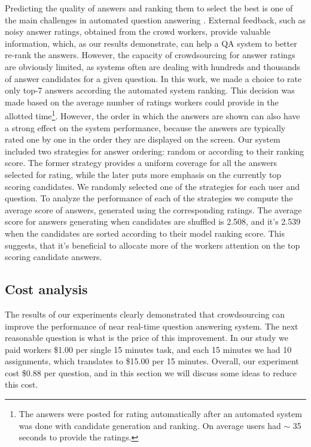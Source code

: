 \documentclass[letterpaper]{article}
\begin{document}
Predicting the quality of answers and ranking them to select the best is one of the main challenges in automated question answering \cite{surdeanu2011learning}.
External feedback, such as noisy answer ratings, obtained from the crowd workers, provide valuable information, which, as our results demonstrate, can help a QA system to better re-rank the answers.
However, the capacity of crowdsourcing for answer ratings are obviously limited, as systems often are dealing with hundreds and thousands of answer candidates for a given question.
In this work, we made a choice to rate only top-7 answers according the automated system ranking.
This decision was made based on the average number of ratings workers could provide in the allotted time\footnote{The answers were posted for rating automatically after an automated system was done with candidate generation and ranking. On average users had $\sim$ 35 seconds to provide the ratings.}.
However, the order in which the answers are shown can also have a strong effect on the system performance, because the answers are typically rated one by one in the order they are displayed on the screen.
Our system included two strategies for answer ordering: random or according to their ranking score.
The former strategy provides a uniform coverage for all the answers selected for rating, while the later puts more emphasis on the currently top scoring candidates.
We randomly selected one of the strategies for each user and question.
To analyze the performance of each of the strategies we compute the average score of answers, generated using the corresponding ratings.
The average score for answers generating when candidates are shuffled is 2.508, and it's 2.539 when the candidates are sorted according to their model ranking score.
This suggests, that it's beneficial to allocate more of the workers attention on the top scoring candidate answers.

\subsection{Cost analysis}
\label{sec:analysis:cost}

The results of our experiments clearly demonstrated that crowdsourcing can improve the performance of near real-time question answering system.
The next reasonable question is what is the price of this improvement.
In our study we paid workers \$1.00 per single 15 minutes task, and each 15 minutes we had 10 assignments, which translates to \$15.00 per 15 minutes.
Overall, our experiment cost \$0.88 per question, and in this section we will discuss some ideas to reduce this cost.
\end{document}
